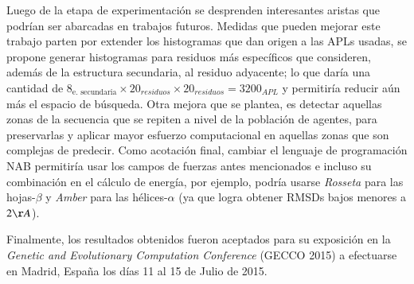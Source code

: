 Luego de la etapa de experimentación se desprenden interesantes aristas que podrían ser abarcadas en trabajos futuros. Medidas que pueden mejorar este trabajo parten por extender los histogramas que dan origen a las APLs usadas, se propone generar histogramas para residuos más específicos que consideren, además de la estructura secundaria, al residuo adyacente; lo que daría una cantidad de $8_{\text{e. secundaria}}{\times}20_{residuos}{\times}20_{residuos}=3200_{APL}$ y permitiría reducir aún más el espacio de búsqueda. Otra mejora que se plantea, es detectar aquellas zonas de la secuencia que se repiten a nivel de la población de agentes, para preservarlas y aplicar mayor esfuerzo computacional en aquellas zonas que son complejas de predecir. Como acotación final, cambiar el lenguaje de programación NAB permitiría usar los campos de fuerzas antes mencionados e incluso su combinación en el cálculo de energía, por ejemplo, podría usarse \textit{Rosseta} para las hojas-$\beta$ y \textit{Amber} para las hélices-$\alpha$ (ya que logra obtener RMSDs bajos menores a $2\AA$).

Finalmente, los resultados obtenidos fueron aceptados para su exposición en la \textit{Genetic and Evolutionary Computation Conference} (GECCO 2015) a efectuarse en Madrid, España los días 11 al 15 de Julio de 2015.